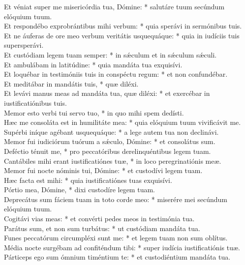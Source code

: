 {	Et véniat super me misericórdia tua, Dómine: * salutáre tuum secúndum elóquium tuum. \\
	Et respondébo exprobrántibus mihi verbum: * quia sperávi in sermónibus tuis. \\
	Et ne áuferas de ore meo verbum veritátis usquequáque: * quia in iudíciis tuis supersperávi. \\
	Et custódiam legem tuam semper: * in sǽculum et in sǽculum sǽculi. \\
	Et ambulábam in latitúdine: * quia mandáta tua exquisívi. \\
	Et loquébar in testimóniis tuis in conspéctu regum: * et non confundébar. \\
	Et meditábar in mandátis tuis, * quæ diléxi. \\
	Et levávi manus meas ad mandáta tua, quæ diléxi: * et exercébar in iustificatiónibus tuis. \\
	Memor esto verbi tui servo tuo, * in quo mihi spem dedísti. \\
	Hæc me consoláta est in humilitáte mea: * quia elóquium tuum vivificávit me. \\
	Supérbi iníque agébant usquequáque: * a lege autem tua non declinávi. \\
	Memor fui iudiciórum tuórum a sǽculo, Dómine: * et consolátus sum. \\
	Deféctio ténuit me, * pro peccatóribus derelinquéntibus legem tuam. \\
	Cantábiles mihi erant iustificatiónes tuæ, * in loco peregrinatiónis meæ. \\
	Memor fui nocte nóminis tui, Dómine: * et custodívi legem tuam. \\
	Hæc facta est mihi: * quia iustificatiónes tuas exquisívi. \\
	Pórtio mea, Dómine, * dixi custodíre legem tuam. \\
	Deprecátus sum fáciem tuam in toto corde meo: * miserére mei secúndum elóquium tuum. \\
	Cogitávi vias meas: * et convérti pedes meos in testimónia tua. \\
	Parátus sum, et non sum turbátus: * ut custódiam mandáta tua. \\
	Funes peccatórum circumpléxi sunt me: * et legem tuam non sum oblítus. \\
	Média nocte surgébam ad confiténdum tibi: * super iudícia iustificatiónis tuæ. \\
	Párticeps ego sum ómnium timéntium te: * et custodiéntium mandáta tua. \\
}
